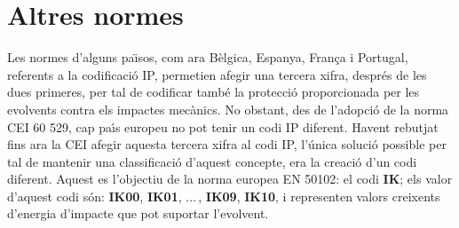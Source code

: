 \section{Altres normes}
Les normes d'alguns pa\"{\i}sos, com ara B\`{e}lgica, Espanya, Fran\c{c}a i
Portugal, referents a la codificaci\'{o} \textsf{IP}, permetien afegir
una tercera xifra, despr\'{e}s de les dues primeres,  per tal de
codificar tamb\'{e} la protecci\'{o} proporcionada per les evolvents contra
els impactes mec\`{a}nics. No obstant, des de l'adopci\'{o} de la norma
\textsf{CEI 60 529}, cap pa\'{\i}s europeu no pot tenir
un codi \textsf{IP} diferent. Havent rebutjat fins ara la
\textsf{CEI} afegir aquesta tercera xifra al codi \textsf{IP},
l'\'{u}nica soluci\'{o} possible per tal de mantenir una classificaci\'{o}
d'aquest concepte, era la creaci\'{o} d'un codi diferent. Aquest es
l'objectiu de la norma europea \textsf{EN 50102}: el
codi \textbf{\textsf{IK}}; els valor d'aquest codi s\'{o}n:
\textbf{\textsf{IK00}}, \textbf{\textsf{IK01}}, ...\,,
\textbf{\textsf{IK09}}, \textbf{\textsf{IK10}}, i representen valors
creixents d'energia d'impacte que pot suportar l'evolvent.
